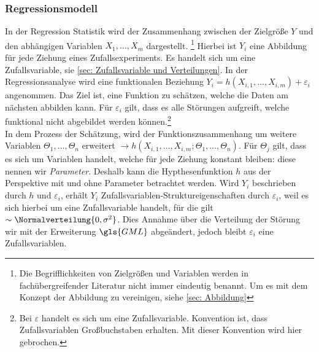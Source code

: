 \subsubsection{Regressionsmodell}
In der Regression Statistik wird der Zusammenhang zwischen der Zielgröße $Y$ und den abhängigen Variablen $X_1, \dots, X_m$ dargestellt.
\footnote{
	Die Begrifflichkeiten von Zielgrößen und Variablen werden in fachübergreifender Literatur nicht immer eindeutig benannt. Um es mit dem Konzept der Abbildung zu vereinigen, siehe  \ref{sec: Abbildung}
}
Hierbei ist $Y_i$ eine Abbildung für jede Ziehung eines Zufallsexperiments. Es handelt sich um eine Zufallsvariable, sie \ref{sec: Zufallsvariable und Verteilungen}. In der Regressionsanalyse wird eine funktionalen Beziehung $Y_i = h\left(X_{i,1}, \dots, X_{i,m}\right) + \varepsilon_i$ angenommen. Das Ziel ist, eine Funktion zu schätzen, welche die Daten am nächsten abbilden kann. Für $\varepsilon_i$ gilt, dass es alle Störungen aufgreift, welche funktional nicht abgebildet werden können.\footnote{
	Bei $\varepsilon$ handelt es sich um eine Zufallsvariable. Konvention ist, dass Zufallsvariablen Großbuchstaben erhalten. Mit dieser Konvention wird hier gebrochen.} \\

In dem Prozess der Schätzung, wird der Funktionszusammenhang um weitere Variablen $\varTheta_1, \dots, \varTheta_n$ erweitert $\rightarrow  h\left(X_{i,1}, \dots, X_{i,m}; \varTheta_1, \dots, \varTheta_n\right)$. Für $\varTheta_j$ gilt, dass es sich um Variablen handelt, welche für jede Ziehung konstant bleiben: diese nennen wir \textit{Parameter}. Deshalb kann die Hypthesenfunktion $h$ aus der Perspektive mit und ohne Parameter betrachtet werden. Wird $Y_i$ beschrieben durch $h$ und $\varepsilon_i$, erhält $Y_i$ Zufallsvariablen-Struktureigenschaften durch $\varepsilon_i$, weil es sich hierbei um eine Zufallsvariable handelt, für die gilt $\sim \Normalverteilung{0, \sigma^2}$. Dies Annahme über die Verteilung der Störung wir mit der Erweiterung $\gls{GML}$ abgeändert, jedoch bleibt $\varepsilon_i$ eine Zufallsvariablen. \\

